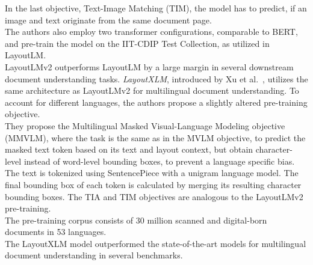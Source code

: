 In the last objective, Text-Image Matching (TIM), the model has to predict, if an image and text originate from the same document page.\\
The authors also employ two transformer configurations, comparable to BERT, and pre-train the model on the IIT-CDIP Test Collection, as utilized in LayoutLM.\\ LayoutLMv2 outperforms LayoutLM by a large margin in several downstream document understanding tasks.\newpage
\textit{LayoutXLM}, introduced by Xu et al.~\cite{xu2021layoutxlm}, utilizes the same architecture as LayoutLMv2 for multilingual document understanding. To account for different languages, the authors propose a slightly altered pre-training objective.\\
They propose the Multilingual Masked Visual-Language Modeling objective (MMVLM), where the task is the same as in the MVLM objective, to predict the masked text token based on its text and layout context, but obtain character-level instead of word-level bounding boxes, to prevent a language specific bias. The text is tokenized using SentencePiece with a unigram language model. The final bounding box of each token is calculated by merging its resulting character bounding boxes.
The TIA and TIM objectives are analogous to the LayoutLMv2 pre-training.\\
The pre-training corpus consists of 30 million scanned and digital-born documents in 53 languages.\\
The LayoutXLM model outperformed the state-of-the-art models for multilingual document understanding in several benchmarks.
